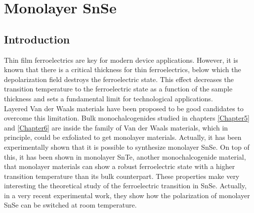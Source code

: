 
\chapter{Monolayer SnSe} %

\label{Chapter7} %




\section{Introduction}

Thin film ferroelectrics are key for modern device applications\cite{lallart2011ferroelectrics}. However, it is 
known that there is a critical thickness for thin ferroelectrics, below which the depolarization field destroys the 
ferroelectric state\cite{batra1973new,zhong1994giant,dawber2005physics}. This effect decreases the transition 
temperature to the ferroelectric state as a function of the sample 
thickness\cite{fong2004ferroelectricity,fong2006stabilization} and sets a fundamental limit for technological  
applications. \\

Layered Van der Waals materials have been proposed to be good candidates to overcome this 
limitation\cite{shirodkar2014emergence,fei2016ferroelectricity}. 
Bulk monochalcogenides studied in chapters \ref{Chapter5} and \ref{Chapter6} are inside the family of Van der Waals 
materials, which in principle, could be exfoliated to get monolayer materials. Actually, it has been experimentally 
shown that it is possible to synthesize monolayer SnSe\cite{li2013single,zhao2015controlled}. On top of this, it has 
been shown in monolayer SnTe, another monochalcogenide material, that monolayer materials can show a robust 
ferroelectric state with a higher transition temperature than its bulk counterpart\cite{chang2016discovery}. These 
properties make very interesting the theoretical study of the ferroelectric transition in SnSe. Actually, in a very 
recent experimental work\cite{chang2020controlled}, they show how the polarization of monolayer SnSe can be switched 
at room temperature. \\

